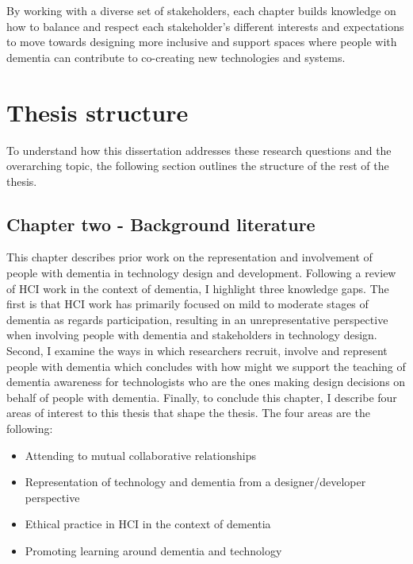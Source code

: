 By working with a diverse set of stakeholders, each chapter builds knowledge on how to balance and respect each stakeholder's different interests and expectations to move towards designing more inclusive and support spaces where people with dementia can contribute to co-creating new technologies and systems.

\section{Thesis structure}
\label{Intro: Thesis structure}
To understand how this dissertation addresses these research questions and the overarching topic, the following section outlines the structure of the rest of the thesis.

\subsection{Chapter two - Background literature}
\label{Intro:ChapterTwo}
This chapter describes prior work on the representation and involvement of people with dementia in technology design and development. Following a review of HCI work in the context of dementia, I highlight three knowledge gaps. The first is that HCI work has primarily focused on mild to moderate stages of dementia as regards participation, resulting in an unrepresentative perspective when involving people with dementia and stakeholders in technology design. Second, I examine the ways in which researchers recruit, involve and represent people with dementia which concludes with how might we support the teaching of dementia awareness for technologists who are the ones making design decisions on behalf of people with dementia. Finally, to conclude this chapter, I describe four areas of interest to this thesis that shape the thesis. The four areas are the following: 
\begin{itemize}
    \item Attending to mutual collaborative relationships
    \item Representation of technology and dementia from a designer/developer perspective
    \item Ethical practice in HCI in the context of dementia
    \item Promoting learning around dementia and technology
\end{itemize}

